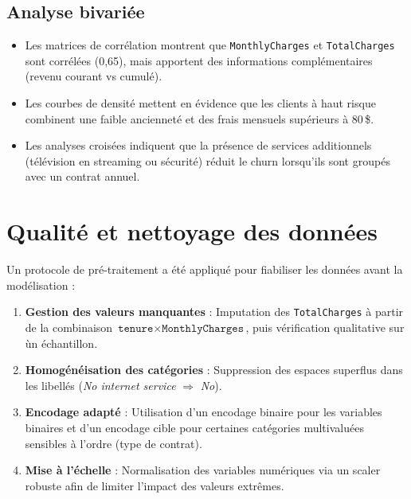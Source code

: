 \subsection{Analyse bivari\'ee}
\begin{itemize}
    \item Les matrices de corr\'elation montrent que \texttt{MonthlyCharges} et \texttt{TotalCharges} sont corr\'el\'ees (0,65), mais apportent des informations compl\'ementaires (revenu courant vs cumul\'e).
    \item Les courbes de densit\'e mettent en \'evidence que les clients \`a haut risque combinent une faible anciennet\'e et des frais mensuels sup\'erieurs \`a 80\,\$.
    \item Les analyses crois\'ees indiquent que la pr\'esence de services additionnels (t\'el\'evision en streaming ou s\'ecurit\'e) r\'eduit le churn lorsqu'ils sont group\'es avec un contrat annuel.
\end{itemize}

\section{Qualit\'e et nettoyage des donn\'ees}
Un protocole de pr\'e-traitement a \'et\'e appliqu\'e pour fiabiliser les donn\'ees avant la mod\'elisation :
\begin{enumerate}
    \item \textbf{Gestion des valeurs manquantes} : Imputation des \texttt{TotalCharges} \`a partir de la combinaison $\texttt{tenure} \times \texttt{MonthlyCharges}$, puis v\'erification qualitative sur \`un \'echantillon.
    \item \textbf{Homog\'en\'eisation des cat\'egories} : Suppression des espaces superflus dans les libell\'es (\textit{No internet service} $\Rightarrow$ \textit{No}).
    \item \textbf{Encodage adapt\'e} : Utilisation d'un encodage binaire pour les variables binaires et d'un encodage cible pour certaines cat\'egories multivalu\'ees sensibles \`a l'ordre (type de contrat).
    \item \textbf{Mise \`a l'\'echelle} : Normalisation des variables num\'eriques via un scaler robuste afin de limiter l'impact des valeurs extr\^emes.
\end{enumerate}

